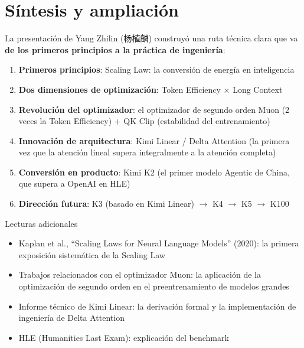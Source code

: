 \section{Síntesis y ampliación}

La presentación de Yang Zhilin (杨植麟) construyó una ruta técnica clara que va \textbf{de los primeros principios a la práctica de ingeniería}:

\begin{enumerate}
\item \textbf{Primeros principios}: Scaling Law: la conversión de energía en inteligencia
\item \textbf{Dos dimensiones de optimización}: Token Efficiency $\times$ Long Context
\item \textbf{Revolución del optimizador}: el optimizador de segundo orden Muon (2 veces la Token Efficiency) + QK Clip (estabilidad del entrenamiento)
\item \textbf{Innovación de arquitectura}: Kimi Linear / Delta Attention (la primera vez que la atención lineal supera integralmente a la atención completa)
\item \textbf{Conversión en producto}: Kimi K2 (el primer modelo Agentic de China, que supera a OpenAI en HLE)
\item \textbf{Dirección futura}: K3 (basado en Kimi Linear) $\rightarrow$ K4 $\rightarrow$ K5 $\rightarrow$ K100
\end{enumerate}

\begin{knowledgebox}{Lecturas adicionales}
\begin{itemize}
\item Kaplan et al., ``Scaling Laws for Neural Language Models'' (2020): la primera exposición sistemática de la Scaling Law
\item Trabajos relacionados con el optimizador Muon: la aplicación de la optimización de segundo orden en el preentrenamiento de modelos grandes
\item Informe técnico de Kimi Linear: la derivación formal y la implementación de ingeniería de Delta Attention
\item HLE (Humanities Last Exam): explicación del benchmark
\end{itemize}
\end{knowledgebox}



